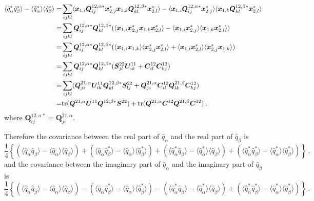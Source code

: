 \documentclass[12pt,a4paper]{article}
\begin{document}
\begin{align}
\langle \hat{q}_\alpha^* \hat{q}_\beta^*\rangle - \langle \hat{q}_\alpha^* \rangle\langle \hat{q}_\beta^*\rangle=&
\sum_{ijkl}\langle \bm{x}_{1,i}\bm{Q}^{12,\alpha*}_{ij}\bm{x}_{2,j}^*\bm{x}_{1,k}\bm{Q}^{12,\beta*}_{kl}\bm{x}_{2,l}^*\rangle - \langle \bm{x}_{1,i}\bm{Q}^{12,\alpha*}_{ij}\bm{x}_{2,j}^*\rangle\langle \bm{x}_{1,k}\bm{Q}^{12,\beta*}_{kl}\bm{x}_{2,l}^*\rangle \notag\\
=&\sum_{ijkl} \bm{Q}^{12,\alpha*}_{ij}\bm{Q}^{12,\beta*}_{kl}(\langle \bm{x}_{1,i}\bm{x}_{2,j}^* \bm{x}_{1,k}\bm{x}_{2,l}^*\rangle - \langle \bm{x}_{1,i}\bm{x}_{2,j}^*\rangle\langle \bm{x}_{1,k}\bm{x}_{2,l}^*\rangle)\notag\\
=&\sum_{ijkl}  \bm{Q}^{12,\alpha*}_{ij}\bm{Q}^{12,\beta*}_{kl}(\langle \bm{x}_{1,i}\bm{x}_{1,k}\rangle \langle \bm{x}_{2,j}^*\bm{x}_{2,l}^*\rangle + \langle \bm{x}_{1,i}\bm{x}_{2,l}^*\rangle\langle \bm{x}_{2,j}^*\bm{x}_{1,k}\rangle)\notag\\
=&\sum_{ijkl} \bm{Q}^{12,\alpha*}_{ij}\bm{Q}^{12,\beta*}_{kl} ( \bm{S}_{jl}^{22}\bm{U}_{ik}^{11} + \bm{C}^{12}_{il}\bm{C}^{12}_{kj})\notag\\
=&\sum_{ijkl}( \bm{Q}^{21,\alpha}_{ji}\bm{U}_{ik}^{11}\bm{Q}^{12,\beta*}_{kl} \bm{S}_{lj}^{22} + \bm{Q}^{21,\alpha}_{ji}\bm{C}^{12}_{il} \bm{Q}^{21,\beta}_{lk} \bm{C}^{12}_{kj} ) \notag\\
=&\text{tr}(\bm{Q}^{21,\alpha} \bm{U}^{11} \bm{Q}^{12,\beta*} \bm{S}^{22}) + \text{tr}( \bm{Q}^{21,\alpha} \bm{C}^{12} \bm{Q}^{21,\beta} \bm{C}^{12})\,,
\end{align}
where $\bm{Q}^{12,\alpha*}_{ij}= \bm{Q}^{21,\alpha}_{ji}$.

Therefore the covariance between the real part of $\hat{q}_\alpha$ and the real part of $\hat{q}_\beta$ is 
\begin{equation}
    \frac{1}{4}\left\{ (\langle \hat{q}_\alpha \hat{q}_\beta \rangle - \langle \hat{q}_\alpha \rangle\langle \hat{q}_\beta \rangle) + (\langle \hat{q}_\alpha  \hat{q}_\beta^* \rangle - \langle \hat{q}_\alpha \rangle\langle \hat{q}_\beta ^*\rangle) + (\langle \hat{q}_\alpha^*  \hat{q}_\beta \rangle - \langle \hat{q}_\alpha^* \rangle\langle \hat{q}_\beta \rangle)
        + (\langle \hat{q}_\alpha ^*  \hat{q}_\beta ^*\rangle - \langle \hat{q}_\alpha^*\rangle\langle \hat{q}_\beta^*\rangle) \right\}\,,
\end{equation}
and the covariance between the imaginary part of $\hat{q}_\alpha$ and the imaginary part of $\hat{q}_\beta$ is 
\begin{equation}
    \frac{1}{4}\left\{ (\langle \hat{q}_\alpha \hat{q}_\beta \rangle - \langle \hat{q}_\alpha \rangle\langle \hat{q}_\beta \rangle) - (\langle \hat{q}_\alpha  \hat{q}_\beta^* \rangle - \langle \hat{q}_\alpha \rangle\langle \hat{q}_\beta ^*\rangle) - (\langle \hat{q}_\alpha^*  \hat{q}_\beta \rangle - \langle \hat{q}_\alpha^* \rangle\langle \hat{q}_\beta \rangle)
        + (\langle \hat{q}_\alpha ^*  \hat{q}_\beta ^*\rangle - \langle \hat{q}_\alpha^*\rangle\langle \hat{q}_\beta^*\rangle) \right\}\,.
\end{equation}
\end{document}

